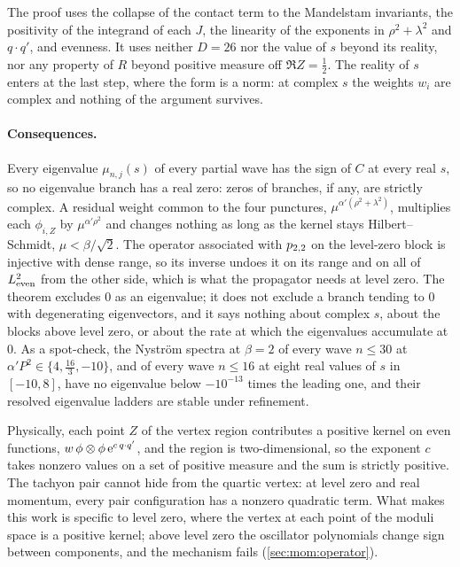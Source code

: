 The proof uses the collapse of the contact term to the Mandelstam invariants, the positivity of the integrand of each $J$, the linearity of the exponents in $\rho^2 + \lambda^2$ and $q \cdot q'$, and evenness.
It uses neither $D = 26$ nor the value of $s$ beyond its reality, nor any property of $R$ beyond positive measure off $\Re Z = \tfrac{1}{2}$.
The reality of $s$ enters at the last step, where the form is a norm: at complex $s$ the weights $w_i$ are complex and nothing of the argument survives.

\paragraph{Consequences.}
Every eigenvalue $\mu_{n, j}(s)$ of every partial wave has the sign of $C$ at every real $s$, so no eigenvalue branch has a real zero: zeros of branches, if any, are strictly complex.
A residual weight common to the four punctures, $\mu^{\alpha' (\rho^2 + \lambda^2)}$, multiplies each $\phi_{i, Z}$ by $\mu^{\alpha' \rho^2}$ and changes nothing as long as the kernel stays Hilbert--Schmidt, $\mu < \beta / \sqrt{2}$.
The operator associated with $p_{2,2}$ on the level-zero block is injective with dense range, so its inverse undoes it on its range and on all of $L^2_{\rm even}$ from the other side, which is what the propagator needs at level zero.
The theorem excludes $0$ as an eigenvalue; it does not exclude a branch tending to $0$ with degenerating eigenvectors, and it says nothing about complex $s$, about the blocks above level zero, or about the rate at which the eigenvalues accumulate at $0$.
As a spot-check, the Nyström spectra at $\beta = 2$ of every wave $n \le 30$ at $\alpha' P^2 \in \{4, \tfrac{16}{3}, -10\}$, and of every wave $n \le 16$ at eight real values of $s$ in $[-10, 8]$, have no eigenvalue below $-10^{-13}$ times the leading one, and their resolved eigenvalue ladders are stable under refinement.

Physically, each point $Z$ of the vertex region contributes a positive kernel on even functions, $w \, \phi \otimes \phi \, \mathrm{e}^{c \, q \cdot q'}$, and the region is two-dimensional, so the exponent $c$ takes nonzero values on a set of positive measure and the sum is strictly positive.
The tachyon pair cannot hide from the quartic vertex: at level zero and real momentum, every pair configuration has a nonzero quadratic term.
What makes this work is specific to level zero, where the vertex at each point of the moduli space is a positive kernel; above level zero the oscillator polynomials change sign between components, and the mechanism fails (\cref{sec:mom:operator}).

